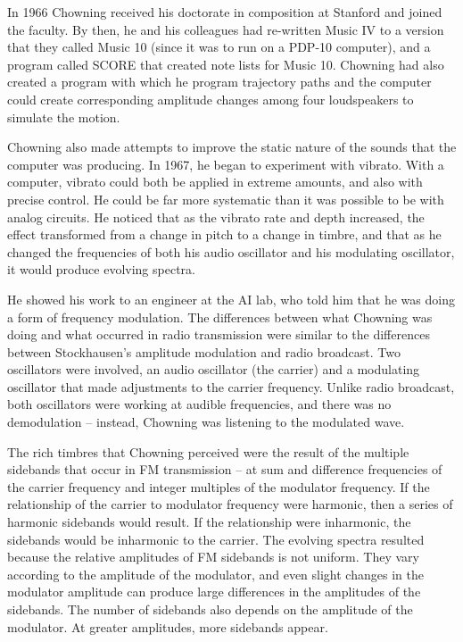 In 1966 Chowning received his doctorate in composition at Stanford and joined the faculty. By then, he and his colleagues had re-written Music IV to a version that they called Music 10 (since it was to run on a PDP-10 computer), and a program called SCORE that created note lists for Music 10. Chowning had also created a program with which he program trajectory paths and the computer could create corresponding amplitude changes among four loudspeakers to simulate the motion.

Chowning also made attempts to improve the static nature of the sounds that the computer was producing. In 1967, he began to experiment with vibrato. With a computer, vibrato could both be applied in extreme amounts, and also with precise control. He could be far more systematic than it was possible to be with analog circuits. He noticed that as the vibrato rate and depth increased, the effect transformed from a change in pitch to a change in timbre, and that as he changed the frequencies of both his audio oscillator and his modulating oscillator, it would produce evolving spectra.

He showed his work to an engineer at the AI lab, who told him that he was doing a form of frequency modulation. The differences between what Chowning was doing and what occurred in radio transmission were similar to the differences between Stockhausen's amplitude modulation and radio broadcast. Two oscillators were involved, an audio oscillator (the carrier) and a modulating oscillator that made adjustments to the carrier frequency. Unlike radio broadcast, both oscillators were working at audible frequencies, and there was no demodulation -- instead, Chowning was listening to the modulated wave.

The rich timbres that Chowning perceived were the result of the multiple sidebands that occur in FM transmission -- at sum and difference frequencies of the carrier frequency and integer multiples of the modulator frequency. If the relationship of the carrier to modulator frequency were harmonic, then a series of harmonic sidebands would result. If the relationship were inharmonic, the sidebands would be inharmonic to the carrier. The evolving spectra resulted because the relative amplitudes of FM sidebands is not uniform. They vary according to the amplitude of the modulator, and even slight changes in the modulator amplitude can produce large differences in the amplitudes of the sidebands. The number of sidebands also depends on the amplitude of the modulator. At greater amplitudes, more sidebands appear.

